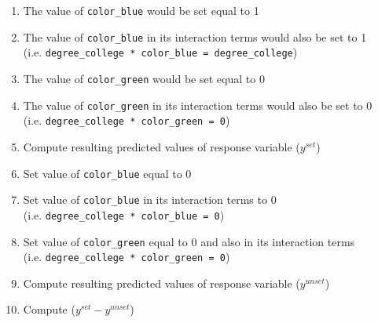 \begin{enumerate}
\item The value of \verb|color_blue| would be set equal to 1
\item The value of \verb|color_blue| in its interaction terms would also be set to 1 \\
(i.e. \verb|degree_college * color_blue = degree_college|)
\item The value of \verb|color_green| would be set equal to 0
\item The value of \verb|color_green| in its interaction terms would also be set to 0 \\
(i.e. \verb|degree_college * color_green = 0|)
\item Compute resulting predicted values of response variable ($y^{set}$)
\item Set value of \verb|color_blue| equal to 0
\item Set value of \verb|color_blue| in its interaction terms to 0 \\
(i.e. \verb|degree_college * color_blue = 0|)
\item Set value of \verb|color_green| equal to 0 and also in its interaction terms \\
(i.e. \verb|degree_college * color_green = 0|)
\item Compute resulting predicted values of response variable ($y^{unset}$)
\item Compute ($y^{set} - y^{unset}$)
\end{enumerate}

